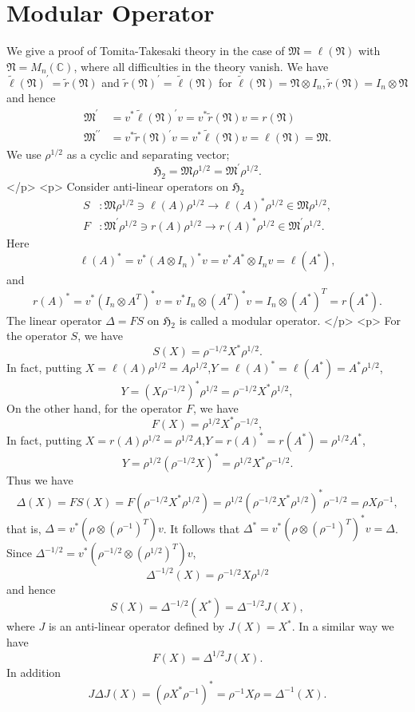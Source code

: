 \section{Modular Operator}
We give a proof  of Tomita-Takesaki theory in the case of 
$\mathfrak{M}=\ell(\mathfrak{N})$ with $\mathfrak{N}=M_n(\mathbb{C})$,
where all difficulties in the theory vanish.
We have 
$\tilde{\ell}(\mathfrak{N})^\prime=\tilde{r}(\mathfrak{N})$ and $\tilde{r}(\mathfrak{N})^\prime=\tilde{\ell}(\mathfrak{N})$ for 
$
\tilde{\ell}(\mathfrak{N})=\mathfrak{N}\otimes I_n,\tilde{r}(\mathfrak{N})=I_n\otimes \mathfrak{N}
$
and hence 
\begin{equation}
\begin{split}
\mathfrak{M}^\prime&=v^\ast \tilde{\ell}(\mathfrak{N})^\prime v= v^\ast \tilde{r}(\mathfrak{N})v=r(\mathfrak{N}) \\
\mathfrak{M}^{\prime\prime}&=v^\ast \tilde{r}(\mathfrak{N})^\prime v= v^\ast \tilde{\ell}(\mathfrak{N})v=\ell(\mathfrak{N})=\mathfrak{M}.
\end{split}
\end{equation}
We use $\rho^{1/2}$ as a cyclic and separating vector;
$$
\mathfrak{H}_2=\mathfrak{M}\rho^{1/2}=\mathfrak{M}^\prime \rho^{1/2}.
$$
</p>
<p>  Consider  anti-linear operators on $\mathfrak{H}_2$ 
\begin{equation}
	 \begin{split}
		 S&:\mathfrak{M}\rho^{1/2}\ni \ell(A) \rho^{1/2} \to \ell(A)^\ast\rho^{1/2}\in\mathfrak{M}\rho^{1/2},\\
		 F&:\mathfrak{M}^\prime \rho^{1/2}\ni r(A) \rho^{1/2} \to r(A)^\ast\rho^{1/2}\in \mathfrak{M}^\prime \rho^{1/2}.
	 \end{split}
\end{equation}
	Here 
	$$
	\ell(A)^\ast=v^\ast(A\otimes I_n)^\ast v=v^\ast A^\ast \otimes I_n v=\ell(A^\ast),
	$$
	and
	$$
  r(A)^\ast=v^\ast (I_n\otimes A^T)^\ast v=v^\ast I_n\otimes (A^T)^\ast v=I_n\otimes (A^\ast)^T=r(A^\ast).
	$$
	The linear operator $\Delta=FS$ on $\mathfrak{H}_2$ is called a modular operator.
</p>
<p>
For the operator $S$, we have 
	$$
    S(X)=\rho^{-1/2}X^*\rho^{1/2}.
 	$$
	In fact, putting $X=\ell(A)\rho^{1/2}=A\rho^{1/2}$,$Y=\ell(A)^\ast=\ell(A^\ast)=A^\ast \rho^{1/2}$,
	$$
    Y=(X\rho^{-1/2})^\ast \rho^{1/2}=\rho^{-1/2}X^\ast\rho^{1/2},
  $$
On the other hand, for the operator $F$, we have
$$
F(X)=\rho^{1/2}X^\ast \rho^{-1/2},
$$
In fact, putting $X=r(A)\rho^{1/2}=\rho^{1/2}A$,$Y=r(A)^\ast=r(A^\ast)= \rho^{1/2}A^\ast$,
	$$
    Y= \rho^{1/2}(\rho^{-1/2}X)^\ast=\rho^{1/2}X^\ast\rho^{-1/2}.
  $$
Thus we have
$$
\Delta(X)=FS(X)=F(\rho^{-1/2}X^*\rho^{1/2})=\rho^{1/2}(\rho^{-1/2}X^*\rho^{1/2})^\ast \rho^{-1/2}=\rho X \rho^{-1},
$$
that is, $\Delta=v^\ast(\rho \otimes ({\rho}^{-1})^T) v$.
It follows that $\Delta^\ast=v^\ast (\rho\otimes({\rho}^{-1})^T)^\ast v=\Delta$.
Since $\Delta^{-1/2}=v^\ast(\rho^{-1/2}\otimes ({\rho}^{1/2})^T) v$, 
$$
\Delta^{-1/2}(X)=\rho^{-1/2}X\rho^{1/2}
$$
and hence 
$$
S(X)=\Delta^{-1/2}(X^\ast)=\Delta^{-1/2}J(X),
$$
where $J$ is an anti-linear operator defined by $J(X)=X^\ast$.
In a similar way we have
$$
F(X)=\Delta^{1/2}J(X).
$$
In addition 
$$
J\Delta J(X)=(\rho X^\ast \rho^{-1})^\ast=\rho^{-1}X\rho=\Delta^{-1}(X).
$$


